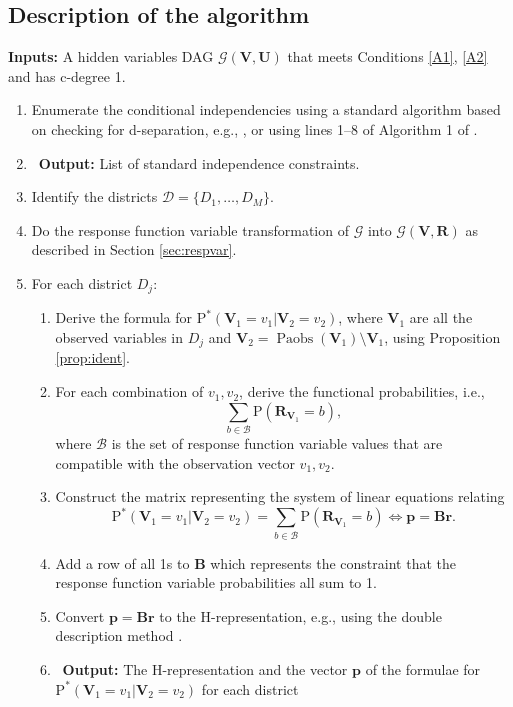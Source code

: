\documentclass[12pt]{article}
\def\Pr{{\mathrm{P}}}
\def\Pdo{{\mathrm{P}^*}}
\DeclareMathOperator{\Paobs}{Paobs}
\newcommand{\bU}{\boldsymbol{U}}
\newcommand{\bV}{\boldsymbol{V}}
\newcommand{\bR}{\boldsymbol{R}}
\begin{document}
\subsection{Description of the algorithm} \label{algorithm}


\textbf{Inputs: } A hidden variables DAG $\mathcal{G}(\bV, \bU)$ that meets Conditions \ref{A1}, \ref{A2} and has c-degree 1. 
\begin{enumerate}
    \item Enumerate the conditional independencies using a standard algorithm based on checking for d-separation, e.g., \citet{van2014constructing}, or using lines 1--8 of Algorithm 1 of \citet{richardson2023nested}.
    \item[] \, \textbf{Output: } List of standard independence constraints.  
    \item Identify the districts $\mathcal{D} = \{D_1, \ldots, D_M\}$. 
    \item Do the response function variable transformation of $\mathcal{G}$ into $\mathcal{G}(\bV, \bR)$ as described in Section \ref{sec:respvar}.
    \item For each district $D_j$: 
   \begin{enumerate}  
        \item Derive the formula for $\Pdo(\bV_1 = v_1 | \bV_2 = v_2)$, where $\bV_1$ are all the observed variables in $D_j$ and $\bV_2 = \Paobs(\bV_1) \setminus \bV_1$, using Proposition \ref{prop:ident}.
        \item For each combination of $v_1, v_2$, derive the functional probabilities, i.e., 
        \[
        \sum_{b \in \mathcal{B}} \Pr(\boldsymbol{R}_{\bV_1} = b), 
        \]
    where $\mathcal{B}$ is the set of response function variable values that are compatible with the observation vector $v_1, v_2$. 
    \item Construct the matrix representing the system of linear equations relating 
    \[
    \Pdo(\bV_1 = v_1 |\bV_2 = v_2) = \sum_{b \in \mathcal{B}} \Pr(\boldsymbol{R}_{\bV_1} = b) \Leftrightarrow \boldsymbol{p} = \boldsymbol{B} \boldsymbol{r}.
    \]
    \item Add a row of all 1s to $\boldsymbol{B}$ which represents the constraint that the response function variable probabilities all sum to 1. 
    \item Convert $\boldsymbol{p} = \boldsymbol{B} \boldsymbol{r}$ to the H-representation, e.g., using the double description method \citep{cdd, doubledescriptionmethod}.
    \item[] \, \textbf{Output: } The H-representation and the vector $\boldsymbol{p}$ of the formulae for $\Pdo(\bV_1 = v_1 |\bV_2 = v_2)$ for each district
    \end{enumerate}
\end{enumerate}
\end{document}
